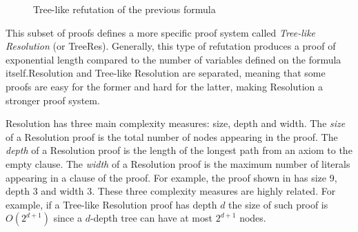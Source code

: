 \begin{figure}[H]
    \centering
    
    
    \caption{Tree-like refutation of the previous formula}
    \label{treelike_res_proof}
\end{figure}

This subset of proofs defines a more specific proof system called \textit{Tree-like Resolution} (or \textsf{TreeRes}). Generally, this type of refutation produces a proof of exponential length compared to the number of variables defined on the formula itself.Resolution and Tree-like Resolution are separated, meaning that some proofs are easy for the former and hard for the latter, making Resolution a stronger proof system.

Resolution has three main complexity measures: size, depth and width. The \textit{size} of a Resolution proof is the total number of nodes appearing in the proof. The \textit{depth} of a Resolution proof is the length of the longest path from an axiom to the empty clause. The \textit{width} of a Resolution proof is the maximum number of literals appearing in a clause of the proof. For example, the proof shown in  has size 9, depth 3 and width 3. These three complexity measures are highly related. For example, if a Tree-like Resolution proof has depth $d$ the size of such proof is $O(2^{d+1})$ since a $d$-depth tree can have at most $2^{d+1}$ nodes.

